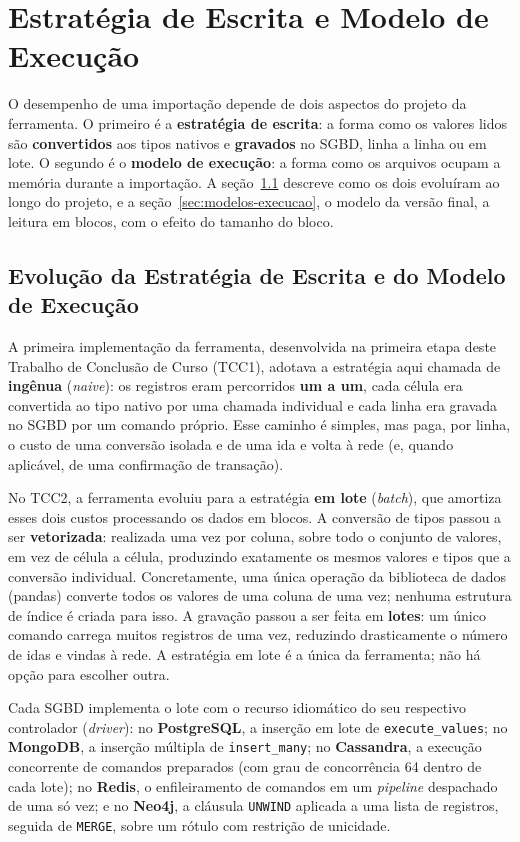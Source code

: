 \section{Estratégia de Escrita e Modelo de Execução}
\label{sec:execucao-estrategias}

O desempenho de uma importação depende de dois aspectos do projeto da ferramenta. O
primeiro é a \textbf{estratégia de escrita}: a forma como os valores lidos são
\textbf{convertidos} aos tipos nativos e \textbf{gravados} no SGBD, linha a linha ou em
lote. O segundo é o \textbf{modelo de execução}: a forma como os arquivos ocupam a memória
durante a importação. A seção~\ref{sec:estrategias-escrita} descreve como os dois
evoluíram ao longo do projeto, e a seção~\ref{sec:modelos-execucao}, o modelo da versão
final, a leitura em blocos, com o efeito do tamanho do bloco.

\subsection{Evolução da Estratégia de Escrita e do Modelo de Execução}
\label{sec:estrategias-escrita}

A primeira implementação da ferramenta, desenvolvida na primeira etapa deste Trabalho de
Conclusão de Curso (TCC1), adotava a estratégia aqui chamada de \textbf{ingênua}
(\textit{naive}): os registros eram percorridos \textbf{um a um}, cada célula era
convertida ao tipo nativo por uma chamada individual e cada linha era gravada no SGBD por
um comando próprio. Esse caminho é simples, mas paga, por linha, o custo de uma conversão
isolada e de uma ida e volta à rede (e, quando aplicável, de uma confirmação de transação).

No TCC2, a ferramenta evoluiu para a estratégia \textbf{em lote} (\textit{batch}), que
amortiza esses dois custos processando os dados em blocos. A conversão de tipos passou a
ser \textbf{vetorizada}: realizada uma vez por coluna, sobre todo o conjunto de valores, em
vez de célula a célula, produzindo exatamente os mesmos valores e tipos que a conversão
individual. Concretamente, uma única operação da biblioteca de dados (pandas) converte
todos os valores de uma coluna de uma vez; nenhuma estrutura de índice é criada para isso.
A gravação passou a ser feita em \textbf{lotes}: um único comando carrega
muitos registros de uma vez, reduzindo drasticamente o número de idas e vindas à rede. A
estratégia em lote é a única da ferramenta; não há opção para escolher outra.

Cada SGBD implementa o lote com o recurso idiomático do seu respectivo controlador
(\textit{driver}): no \textbf{PostgreSQL}, a inserção em lote de \texttt{execute\_values};
no \textbf{MongoDB}, a inserção múltipla de \texttt{insert\_many}; no \textbf{Cassandra}, a
execução concorrente de comandos preparados (com grau de concorrência 64 dentro de cada
lote); no \textbf{Redis}, o enfileiramento de comandos em um \textit{pipeline} despachado
de uma só vez; e no \textbf{Neo4j}, a cláusula \texttt{UNWIND} aplicada a uma lista de
registros, seguida de \texttt{MERGE}, sobre um rótulo com restrição de unicidade.

